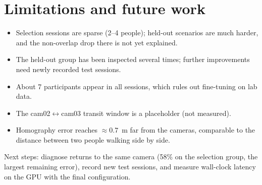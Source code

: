\documentclass[11pt,a4paper]{article}
\begin{document}
\section{Limitations and future work}
\begin{itemize}
  \item Selection sessions are sparse (2--4 people); held-out scenarios are much harder, and
        the non-overlap drop there is not yet explained.
  \item The held-out group has been inspected several times; further improvements need newly
        recorded test sessions.
  \item About 7 participants appear in all sessions, which rules out fine-tuning on lab data.
  \item The cam02$\leftrightarrow$cam03 transit window is a placeholder (not measured).
  \item Homography error reaches $\approx 0.7$~m far from the cameras, comparable to the distance
        between two people walking side by side.
\end{itemize}
Next steps: diagnose returns to the same camera (58\% on the selection group, the largest
remaining error), record new test sessions, and measure wall-clock latency on the GPU with
the final configuration.
\end{document}
